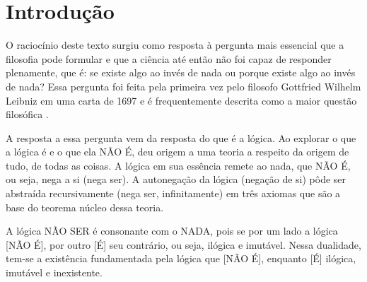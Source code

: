 \section*{Introdução}

O raciocínio deste texto surgiu como resposta à pergunta mais essencial que a filosofia pode formular e que a ciência até então não foi capaz de responder plenamente, que é: se existe algo ao invés de nada ou porque existe algo ao invés de nada? 
Essa pergunta foi feita pela primeira vez pelo filosofo Gottfried Wilhelm Leibniz em uma carta de 1697 e é frequentemente descrita como a maior questão filosófica \cite{ leibnizbrasil_origem_das_coisas}.

A resposta a essa pergunta vem da resposta do que é a lógica. Ao explorar o que a lógica é e o que ela NÃO É, deu origem a uma teoria a respeito da origem de tudo, de todas as coisas. A lógica em sua essência remete ao nada, que NÃO É, ou seja, nega a si (nega ser). A autonegação da lógica (negação de si) pôde ser abstraída recursivamente (nega ser, infinitamente) em três axiomas que são a base do teorema núcleo dessa teoria.

A lógica NÃO SER é consonante com o NADA, pois se por um lado a lógica [NÃO É], por outro [É] seu contrário, ou seja, ilógica e imutável. Nessa dualidade, tem-se a existência fundamentada pela lógica que [NÃO É], enquanto [É] ilógica, imutável e inexistente. 


